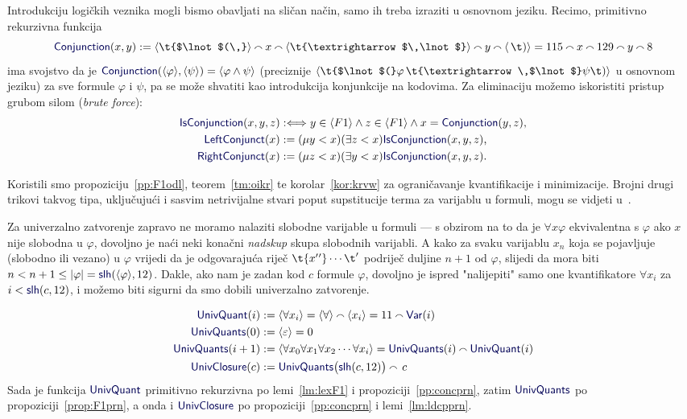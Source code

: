 Introdukciju logičkih veznika mogli bismo obavljati na sličan način, samo ih treba izraziti u osnovnom jeziku. Recimo, primitivno rekurzivna funkcija
\begin{equation}\label{eq:Conjunction}
    \f{Conjunction}(x,y):=
    \kr{\t{$\lnot$(\,}}\conc{}
    x\conc{}
    \kr{\t{\textrightarrow$\,\lnot$}}\conc{}
    y\conc{}
    \kr{\,\t)}=
    115\conc{}
    x\conc{}
    129\conc{}
    y\conc{}
    8
\end{equation}
ima svojstvo da je $\f{Conjunction}(\kr{\varphi},\kr{\psi})=\kr{\varphi\land\psi}$ (preciznije $\kr{\t{$\lnot$(}\varphi\,\t{\textrightarrow\,$\lnot$}\psi\t)}$ u osnovnom jeziku) za sve formule $\varphi$ i $\psi$, pa se može shvatiti kao introdukcija konjunkcije na kodovima. Za eliminaciju možemo iskoristiti pristup grubom silom (\emph{brute force}):
\begin{align}
    \f{IsConjunction}(x,y,z)&:\Longleftrightarrow y\in\kr{F1}\land z\in\kr{F1}\land x=\f{Conjunction}(y,z)\text,
\\\label{eq:lconj}
    \f{LeftConjunct}(x)&:=(\mu y<x)(\exists z<x)\f{IsConjunction}(x,y,z)\text,
\\\label{eq:rconj}
    \f{RightConjunct}(x)&:=(\mu z<x)(\exists y<x)\f{IsConjunction}(x,y,z)\text.
\end{align}

Koristili smo propoziciju~\ref{pp:F1odl}, teorem~\ref{tm:oikr} te korolar~\ref{kor:krvw} za ograničavanje kvantifikacije i minimizacije. Brojni drugi trikovi takvog tipa, uključujući i sasvim netrivijalne stvari poput supstitucije terma za varijablu u formuli, mogu se vidjeti u~\cite{smullyan}.

Za univerzalno zatvorenje zapravo ne moramo nalaziti slobodne varijable u formuli --- s obzirom na to da je $\forall x\varphi$ ekvivalentna s $\varphi$ ako $x$ nije slobodna u $\varphi$, dovoljno je naći neki konačni \emph{nadskup} skupa slobodnih varijabli. A kako za svaku varijablu $x_n$ koja se pojavljuje (slobodno ili vezano) u $\varphi$ vrijedi da je odgovarajuća riječ $\t{x{}'{}'}\dotsm\t'$ podriječ duljine $n+1$ od $\varphi$, slijedi da mora biti $n<n+1\le\dulj\varphi=\f{slh}(\kr{\varphi},12)$. Dakle, ako nam je zadan kod $c$ formule $\varphi$, dovoljno je ispred "nalijepiti" samo one kvantifikatore $\forall x_i$ za $i<\f{slh}(c,12)$, i možemo biti sigurni da smo dobili univerzalno zatvorenje.

\noindent\begin{align}
    \f{UnivQuant}(i)&:=\kr{\forall x_i}=\kr{\forall}\conc{}\kr{x_i}=11\conc{}\f{Var}(i)\\
    \f{UnivQuants}(0)&:=\kr{\varepsilon}=0\\
    \f{UnivQuants}(i+1)&:=\kr{\forall x_0\forall x_1\forall x_2\dotsm\forall x_i}=\f{UnivQuants}(i)\conc{}\f{UnivQuant}(i)\\
    \f{UnivClosure}(c)&:=\f{UnivQuants}\bigl(\f{slh}(c,12)\bigr)\conc{}\,c
\end{align}
Sada je funkcija $\f{UnivQuant}$ primitivno rekurzivna po lemi~\ref{lm:lexF1} i propoziciji~\ref{pp:concprn}, zatim $\f{UnivQuants}$ po propoziciji~\ref{prop:F1prn}, a onda i $\f{UnivClosure}$ po propoziciji~\ref{pp:concprn} i lemi~\ref{lm:ldcpprn}.

